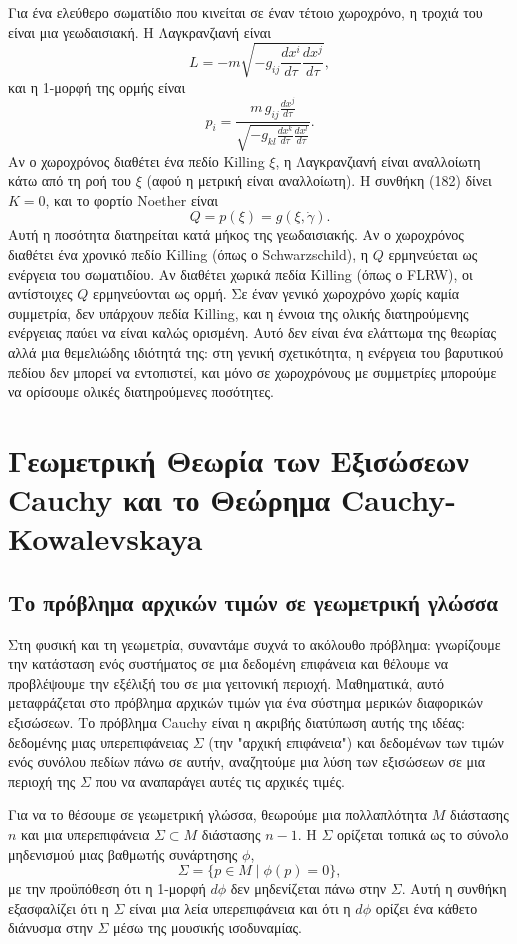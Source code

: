 \documentclass[12pt]{article}
\begin{document}
Για ένα ελεύθερο σωματίδιο που κινείται σε έναν τέτοιο χωροχρόνο, η τροχιά του είναι μια γεωδαισιακή. Η Λαγκρανζιανή είναι
\[
L = -m \sqrt{-g_{ij} \frac{dx^i}{d\tau} \frac{dx^j}{d\tau}},
\]
και η 1-μορφή της ορμής είναι
\[
p_i = \frac{m \, g_{ij} \frac{dx^j}{d\tau}}{\sqrt{-g_{kl} \frac{dx^k}{d\tau} \frac{dx^l}{d\tau}}}.
\]
Αν ο χωροχρόνος διαθέτει ένα πεδίο Killing $\xi$, η Λαγκρανζιανή είναι αναλλοίωτη κάτω από τη ροή του $\xi$ (αφού η μετρική είναι αναλλοίωτη). Η συνθήκη (182) δίνει $K = 0$, και το φορτίο Noether είναι
\[
Q = p(\xi) = g(\xi, \dot{\gamma}).
\]
Αυτή η ποσότητα διατηρείται κατά μήκος της γεωδαισιακής. Αν ο χωροχρόνος διαθέτει ένα χρονικό πεδίο Killing (όπως ο Schwarzschild), η $Q$ ερμηνεύεται ως ενέργεια του σωματιδίου. Αν διαθέτει χωρικά πεδία Killing (όπως ο FLRW), οι αντίστοιχες $Q$ ερμηνεύονται ως ορμή. Σε έναν γενικό χωροχρόνο χωρίς καμία συμμετρία, δεν υπάρχουν πεδία Killing, και η έννοια της ολικής διατηρούμενης ενέργειας παύει να είναι καλώς ορισμένη. Αυτό δεν είναι ένα ελάττωμα της θεωρίας αλλά μια θεμελιώδης ιδιότητά της: στη γενική σχετικότητα, η ενέργεια του βαρυτικού πεδίου δεν μπορεί να εντοπιστεί, και μόνο σε χωροχρόνους με συμμετρίες μπορούμε να ορίσουμε ολικές διατηρούμενες ποσότητες.

\section{Γεωμετρική Θεωρία των Εξισώσεων Cauchy και το Θεώρημα Cauchy-Kowalevskaya}

\subsection{Το πρόβλημα αρχικών τιμών σε γεωμετρική γλώσσα}

Στη φυσική και τη γεωμετρία, συναντάμε συχνά το ακόλουθο πρόβλημα: γνωρίζουμε την κατάσταση ενός συστήματος σε μια δεδομένη επιφάνεια και θέλουμε να προβλέψουμε την εξέλιξή του σε μια γειτονική περιοχή. Μαθηματικά, αυτό μεταφράζεται στο πρόβλημα αρχικών τιμών για ένα σύστημα μερικών διαφορικών εξισώσεων. Το πρόβλημα Cauchy είναι η ακριβής διατύπωση αυτής της ιδέας: δεδομένης μιας υπερεπιφάνειας $\Sigma$ (την "αρχική επιφάνεια") και δεδομένων των τιμών ενός συνόλου πεδίων πάνω σε αυτήν, αναζητούμε μια λύση των εξισώσεων σε μια περιοχή της $\Sigma$ που να αναπαράγει αυτές τις αρχικές τιμές.

Για να το θέσουμε σε γεωμετρική γλώσσα, θεωρούμε μια πολλαπλότητα $M$ διάστασης $n$ και μια υπερεπιφάνεια $\Sigma \subset M$ διάστασης $n-1$. Η $\Sigma$ ορίζεται τοπικά ως το σύνολο μηδενισμού μιας βαθμωτής συνάρτησης $\phi$,
\[
\Sigma = \{ p \in M \mid \phi(p) = 0 \},
\]
με την προϋπόθεση ότι η 1-μορφή $d\phi$ δεν μηδενίζεται πάνω στην $\Sigma$. Αυτή η συνθήκη εξασφαλίζει ότι η $\Sigma$ είναι μια λεία υπερεπιφάνεια και ότι η $d\phi$ ορίζει ένα κάθετο διάνυσμα στην $\Sigma$ μέσω της μουσικής ισοδυναμίας.
\end{document}
